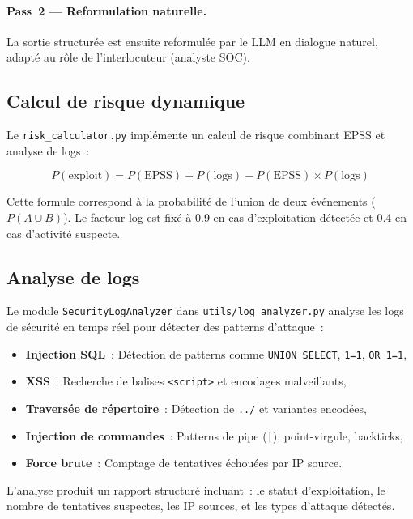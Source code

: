 \documentclass[runningheads]{llncs}
\begin{document}
\paragraph{Pass~2 --- Reformulation naturelle.} La sortie structurée est ensuite reformulée par le LLM en dialogue naturel, adapté au rôle de l'interlocuteur (analyste SOC).

\subsection{Calcul de risque dynamique}

Le \texttt{risk\_calculator.py} implémente un calcul de risque combinant EPSS et analyse de logs~:

\begin{equation}
P(\text{exploit}) = P(\text{EPSS}) + P(\text{logs}) - P(\text{EPSS}) \times P(\text{logs})
\label{eq:risk}
\end{equation}

Cette formule correspond à la probabilité de l'union de deux événements ($P(A \cup B)$). Le facteur log est fixé à 0.9 en cas d'exploitation détectée et 0.4 en cas d'activité suspecte.

\subsection{Analyse de logs}

Le module \texttt{SecurityLogAnalyzer} dans \texttt{utils/log\_analyzer.py} analyse les logs de sécurité en temps réel pour détecter des patterns d'attaque~:

\begin{itemize}[nosep]
    \item \textbf{Injection SQL}~: Détection de patterns comme \texttt{UNION SELECT}, \texttt{1=1}, \texttt{OR 1=1},
    \item \textbf{XSS}~: Recherche de balises \texttt{<script>} et encodages malveillants,
    \item \textbf{Traversée de répertoire}~: Détection de \texttt{../} et variantes encodées,
    \item \textbf{Injection de commandes}~: Patterns de pipe (\texttt{|}), point-virgule, backticks,
    \item \textbf{Force brute}~: Comptage de tentatives échouées par IP source.
\end{itemize}

L'analyse produit un rapport structuré incluant~: le statut d'exploitation, le nombre de tentatives suspectes, les IP sources, et les types d'attaque détectés.
\end{document}
